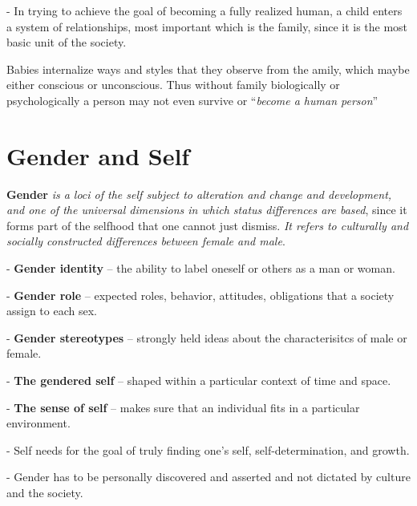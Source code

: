 \documentclass[12pt, UTF8]{article}
\begin{document}
	- In trying to achieve the goal of becoming a fully realized human, a child enters a system of relationships, most important which is the family, since it is the most basic unit of the society.
	
	Babies internalize ways and styles that they observe from the amily, which maybe either conscious or unconscious. Thus without family biologically or psychologically a person may not even survive or ``\textit{become a human person}''
	
	\section{Gender and Self}
	
	\textbf{Gender} \textit{is a loci of the self subject to alteration and change and development, and one of the universal dimensions in which status differences are based}, since it forms part of the selfhood that one cannot just dismiss. \emph{It refers to culturally and socially constructed differences between female and male}.
	
	- \textbf{Gender identity} -- the ability to label oneself or others as a man or woman.
	
	- \textbf{Gender role} -- expected roles, behavior, attitudes, obligations that a society assign to each sex.
	
	- \textbf{Gender stereotypes} -- strongly held ideas about the characterisitcs of male or female.
	
	- \textbf{The gendered self} -- shaped within a particular context of time and space.
	
	- \textbf{The sense of self} -- makes sure that an individual fits in a particular environment.
	
	- Self needs for the goal of truly finding one's self, self-determination, and growth.
	
	- Gender has to be personally discovered and asserted and not dictated by culture and the society.
\end{document}
